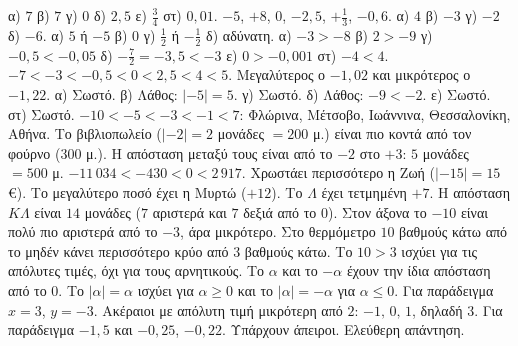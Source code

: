  α) $7$ \quad β) $7$ \quad γ) $0$ \quad δ) $2{,}5$ \quad ε) $\frac{3}{4}$ \quad στ) $0{,}01$.
 $-5$, $+8$, $0$, $-2{,}5$, $+\frac{1}{3}$, $-0{,}6$.
 α) $4$ \quad β) $-3$ \quad γ) $-2$ \quad δ) $-6$.
 α) $5$ ή $-5$ \quad β) $0$ \quad γ) $\frac{1}{2}$ ή $-\frac{1}{2}$ \quad δ) αδύνατη.
 α) $-3>-8$ \quad β) $2>-9$ \quad γ) $-0{,}5<-0{,}05$ \quad δ) $-\frac{7}{2}=-3{,}5<-3$ \quad ε) $0>-0{,}001$ \quad στ) $-4<4$.
 $-7<-3<-0{,}5<0<2{,}5<4<5$.
 Μεγαλύτερος ο $-1{,}02$ και μικρότερος ο $-1{,}22$.
 α) Σωστό. β) Λάθος: $|-5|=5$. γ) Σωστό. δ) Λάθος: $-9<-2$. ε) Σωστό. στ) Σωστό.
 $-10<-5<-3<-1<7$: Φλώρινα, Μέτσοβο, Ιωάννινα, Θεσσαλονίκη, Αθήνα.
 Το βιβλιοπωλείο ($|{-2}|=2$ μονάδες $=200$ μ.) είναι πιο κοντά από τον φούρνο ($300$ μ.). Η απόσταση μεταξύ τους είναι από το $-2$ στο $+3$: $5$ μονάδες $=500$ μ.
 $-11\,034<-430<0<2\,917$.
 Χρωστάει περισσότερο η Ζωή ($|{-15}|=15$ €). Το μεγαλύτερο ποσό έχει η Μυρτώ ($+12$).
 Το $\Lambda$ έχει τετμημένη $+7$. Η απόσταση $K\Lambda$ είναι $14$ μονάδες ($7$ αριστερά και $7$ δεξιά από το $0$).
 Στον άξονα το $-10$ είναι πολύ πιο αριστερά από το $-3$, άρα μικρότερο. Στο θερμόμετρο $10$ βαθμούς κάτω από το μηδέν κάνει περισσότερο κρύο από $3$ βαθμούς κάτω. Το $10>3$ ισχύει για τις απόλυτες τιμές, όχι για τους αρνητικούς.
 Το $\alpha$ και το $-\alpha$ έχουν την ίδια απόσταση από το $0$.
 Το $|\alpha|=\alpha$ ισχύει για $\alpha\ge0$ και το $|\alpha|=-\alpha$ για $\alpha\le0$.
 Για παράδειγμα $x=3$, $y=-3$. Ακέραιοι με απόλυτη τιμή μικρότερη από $2$: $-1,\,0,\,1$, δηλαδή $3$.
 Για παράδειγμα $-1{,}5$ και $-0{,}25$, $-0{,}22$. Υπάρχουν άπειροι.
 Ελεύθερη απάντηση.
